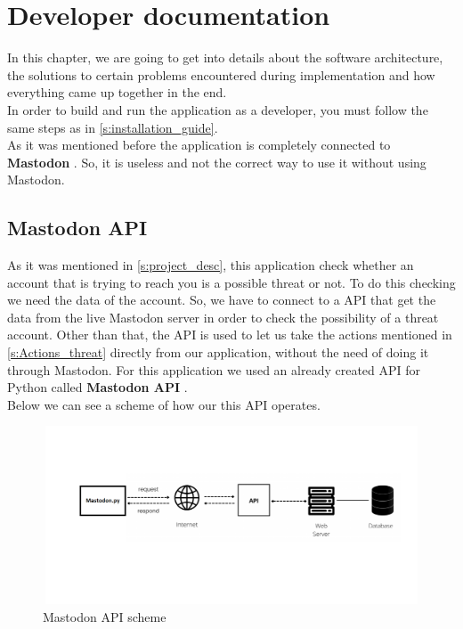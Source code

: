 \chapter{Developer documentation}
\label{ch:impl}

In this chapter, we are going to get into details about the software architecture,
the solutions to certain problems encountered during implementation and how everything came up together in the end.
\\[5pt]
In order to build and run the application as a developer, you must follow the same steps as in \ref{s:installation_guide}.
\\[5pt]
As it was mentioned before the application is completely connected to \textbf{Mastodon} \cite{test}. So, it is useless and
not the correct way to use it without using Mastodon.




\section{Mastodon API}\label{s:api}
As it was mentioned in \ref{s:project_desc}, this application check whether an account
that is trying to reach you is a possible threat or not. To do this checking we need the data
of the account. So, we have to connect to a API that get the data from
the live Mastodon server in order to check the possibility of a threat account.
Other than that, the API is used to let us take the actions mentioned in \ref{s:Actions_threat}
directly from our application, without the need of doing it through Mastodon.
For this application we used an already created API for Python called
\textbf{Mastodon API}  \cite{apimast}.
\\[5pt]
Below we can see a scheme of how our this API operates.
\\[5pt]
\begin{figure}[H]
	\centering
	\includegraphics[width=1.0\textwidth,height=200px]{images/MastodonApi.png}
	\caption{Mastodon API scheme}
	\label{fig:mast_api}
\end{figure}
